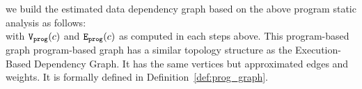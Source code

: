 \label{sec:refine-static-adapt}
we build the estimated data dependency graph based on the above program static analysis as follows:
\\
\highlight{
  \[
    \progG(c) = (\progV(c), \progE(c))
    \]
}
with $\mathtt{{V_{prog}}}(c)$ and  $\mathtt{{E_{prog}}}(c)$
as computed in each steps above.
%
This program-based graph program-based graph has a similar topology structure as 
the Execution-Based Dependency Graph. It has the same
vertices 
but approximated edges and weights.  
It is formally defined in Definition~\ref{def:prog_graph}.
